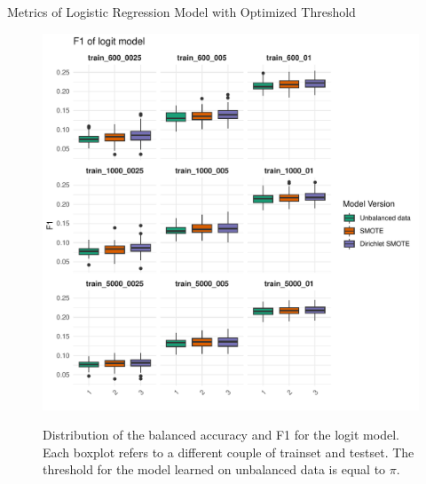 \documentclass{beamer}
\begin{document}
\begin{frame}{Metrics of Logistic Regression Model with Optimized Threshold}
\begin{figure}
\begin{minipage}{0.42\textwidth}
      \includegraphics[width=\linewidth]{images/Logit_f1_optimized_threshold.pdf}
      \label{fig:label11}
    \end{minipage}
    \caption{Distribution of the balanced accuracy and F1 for the logit model. Each boxplot refers to a different couple of trainset and testset. The threshold for the model learned on unbalanced data is equal to $\pi$.}
  \end{figure}
\end{frame}
\end{document}
